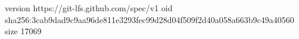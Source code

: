 version https://git-lfs.github.com/spec/v1
oid sha256:3cab9dad9c9aa96de811e3293fec99d28d04f509f2d40a058a663b9c49a40560
size 17069
